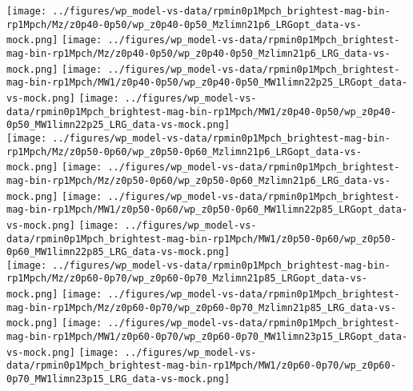 \documentclass[twocolumn,apj,iop,tighten]{emulateapj2}
\begin{document}
\begin{figure*}
\centering
\texttt{[image: ../figures/wp\_model-vs-data/rpmin0p1Mpch\_brightest-mag-bin-rp1Mpch/Mz/z0p40-0p50/wp\_z0p40-0p50\_Mzlimn21p6\_LRGopt\_data-vs-mock.png]}
\texttt{[image: ../figures/wp\_model-vs-data/rpmin0p1Mpch\_brightest-mag-bin-rp1Mpch/Mz/z0p40-0p50/wp\_z0p40-0p50\_Mzlimn21p6\_LRG\_data-vs-mock.png]}
\texttt{[image: ../figures/wp\_model-vs-data/rpmin0p1Mpch\_brightest-mag-bin-rp1Mpch/MW1/z0p40-0p50/wp\_z0p40-0p50\_MW1limn22p25\_LRGopt\_data-vs-mock.png]}
\texttt{[image: ../figures/wp\_model-vs-data/rpmin0p1Mpch\_brightest-mag-bin-rp1Mpch/MW1/z0p40-0p50/wp\_z0p40-0p50\_MW1limn22p25\_LRG\_data-vs-mock.png]}
\\
\texttt{[image: ../figures/wp\_model-vs-data/rpmin0p1Mpch\_brightest-mag-bin-rp1Mpch/Mz/z0p50-0p60/wp\_z0p50-0p60\_Mzlimn21p6\_LRGopt\_data-vs-mock.png]}
\texttt{[image: ../figures/wp\_model-vs-data/rpmin0p1Mpch\_brightest-mag-bin-rp1Mpch/Mz/z0p50-0p60/wp\_z0p50-0p60\_Mzlimn21p6\_LRG\_data-vs-mock.png]}
\texttt{[image: ../figures/wp\_model-vs-data/rpmin0p1Mpch\_brightest-mag-bin-rp1Mpch/MW1/z0p50-0p60/wp\_z0p50-0p60\_MW1limn22p85\_LRGopt\_data-vs-mock.png]}
\texttt{[image: ../figures/wp\_model-vs-data/rpmin0p1Mpch\_brightest-mag-bin-rp1Mpch/MW1/z0p50-0p60/wp\_z0p50-0p60\_MW1limn22p85\_LRG\_data-vs-mock.png]}
\\
\texttt{[image: ../figures/wp\_model-vs-data/rpmin0p1Mpch\_brightest-mag-bin-rp1Mpch/Mz/z0p60-0p70/wp\_z0p60-0p70\_Mzlimn21p85\_LRGopt\_data-vs-mock.png]}
\texttt{[image: ../figures/wp\_model-vs-data/rpmin0p1Mpch\_brightest-mag-bin-rp1Mpch/Mz/z0p60-0p70/wp\_z0p60-0p70\_Mzlimn21p85\_LRG\_data-vs-mock.png]}
\texttt{[image: ../figures/wp\_model-vs-data/rpmin0p1Mpch\_brightest-mag-bin-rp1Mpch/MW1/z0p60-0p70/wp\_z0p60-0p70\_MW1limn23p15\_LRGopt\_data-vs-mock.png]}
\texttt{[image: ../figures/wp\_model-vs-data/rpmin0p1Mpch\_brightest-mag-bin-rp1Mpch/MW1/z0p60-0p70/wp\_z0p60-0p70\_MW1limn23p15\_LRG\_data-vs-mock.png]}

\end{figure*}
\end{document}
